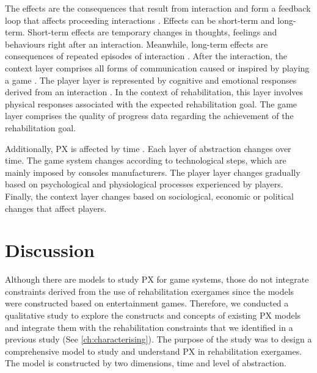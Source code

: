 The effects are the consequences that result from interaction \autocite{Fernandez2008} and form a feedback loop that affects proceeding interactions \autocite{Nacked,Elson2014}. Effects can be short-term and long-term. Short-term effects are temporary changes in thoughts, feelings and behaviours right after an interaction. Meanwhile, long-term effects are consequences of repeated episodes of interaction \autocite{Elson2014}. After the interaction, the context layer comprises all forms of communication caused or inspired by playing a game \autocite{Elson2014}. The player layer is represented by cognitive and emotional responses derived from an interaction \autocite{Fernandez2008}. In the context of rehabilitation, this layer involves physical responses associated with the expected rehabilitation goal. The game layer comprises the quality of progress data regarding the achievement of the rehabilitation goal.

Additionally, \ac{PX} is affected by time \autocite{Nackea2}. Each layer of abstraction changes over time. The game system changes according to technological steps, which are mainly imposed by consoles manufacturers. The player layer changes gradually based on psychological and physiological processes experienced by players. Finally, the context layer changes based on sociological, economic or political changes that affect players.

\section{Discussion} %
\label{sec:discussion_model}
Although there are models to study \ac{PX} for game systems, those do not integrate constraints derived from the use of rehabilitation exergames since the models were constructed based on entertainment games. Therefore, we conducted a qualitative study to explore the constructs and concepts of existing \ac{PX} models and integrate them with the rehabilitation constraints that we identified in a previous study (See \autoref{ch:characterising}). The purpose of the study was to design a comprehensive model to study and understand \ac{PX} in rehabilitation exergames. The model is constructed by two dimensions, time and level of abstraction. 

